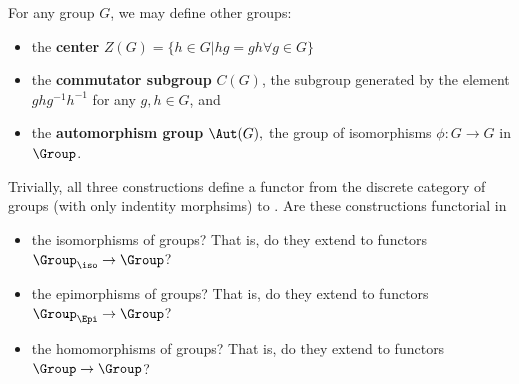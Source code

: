 \documentclass[main.tex]{subfiles}
\begin{document}
\begin{exercise}
For any group $G$, we may define other groups: 
\begin{itemize}
    \item the \textbf{center} $Z(G) = \{h \in G | hg = gh \forall g\in G\}$
    \item the \textbf{commutator subgroup} $C(G)$, the subgroup generated by the element $ghg^{-1}h^{-1}$ for any $g,h \in G$, and
    \item the \textbf{automorphism group} $ \Aut(G), $ the group of isomorphisms $\phi\colon G \rightarrow G$ in $\Group$.
\end{itemize}
Trivially, all three constructions define a functor from the discrete category of groups (with only indentity morphsims) to \Group. Are these constructions functorial in 
\begin{itemize}
    \item the isomorphisms of groups? That is, do they extend to functors $\Group_{\iso} \rightarrow \Group$?
    \item the epimorphisms of groups? That is, do they extend to functors $\Group_{\Epi} \rightarrow \Group$?
    \item the homomorphisms of groups? That is, do they extend to functors $\Group \rightarrow \Group$?
\end{itemize}
\end{exercise}
\end{document}
